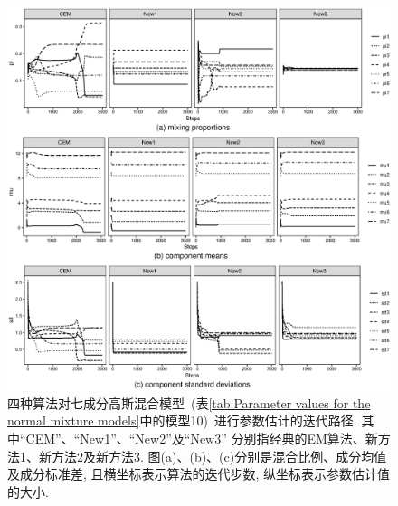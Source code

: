\documentclass[a4paper,12pt,openany,oneside,utf-8]{ctexbook}
\begin{document}
\begin{figure}[p]
  \centering
  \includegraphics[width = 1\textwidth]{Figure_1_Iteration_paths_for_the_normal_mixture_model_10_with_unknown_sigma.eps}%
  \caption{四种算法对七成分高斯混合模型~(表\ref{tab:Parameter values for the normal mixture models}中的模型10)~进行参数估计的迭代路径. 其中``CEM''、``New1''、``New2''及``New3'' 分别指经典的EM算法、新方法1、新方法2及新方法3. 图(a)、(b)、(c)分别是混合比例、成分均值及成分标准差, 且横坐标表示算法的迭代步数, 纵坐标表示参数估计值的大小.}
  \label{fig:Iteration paths for the normal mixture model 10 with unknown sigma} %
\end{figure}
\end{document}
